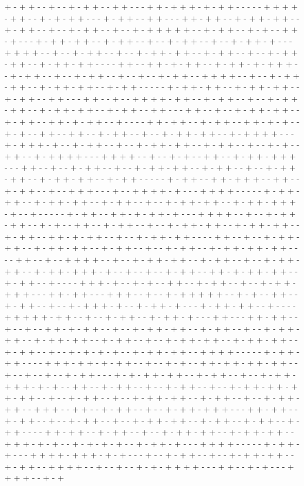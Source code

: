 + - + + - - + - - + - + + - - + + - - - + + - + + + - + - + + - - - - - + + + + - + + - - + - + - + + - - - + - + + - - + + - - - + + - + + - - + - + + - + + - - + - + + - - + - - + - + + - - + - - + - + + + + + - - + - + + - - + - + - - + + - + - - - + - + + - + + - - + - + + - - + - - + - + + - - + - - + - + + - + - - - + + + + - - + - - + - + + - - + - - + - + + - + + - - + - + + - - + - - + - + + - + + - - + - + + - + + - - - - + + - - + + - + - + + - - + - + + - + - + + + - - + - + + - - + - - + - + + - - + - - + - - + - + + - - + + + + - - + - - + - + + - + + - - + - + + - + + - - + - + + - - - - - + - + + - + + - - + - + + - + + - - + - + + - - + + - - - + + - - + - - + + + + - + + - - + - + + - - + - - + - + + - + + - - + - + + - + + - - + - + + - - + + - - - + + - - + - - + - + + - + + - - + - + + - - + + - + - + + - - + - - - - + + - + + - - + - + + - - + + - + - + - - + - + - - + + - - + + - - + - + + - - + - - + - + + - + + - - + - + + + + - - - + - + + + - + - - + - + + - - + - - + - + + - + + - - + - + + - - + - - + - + - - + + - - + - + + + + - - - + + + + - - + - - + - + - - + + - - + - + + - + + + - - - + + - - + - - + - + + - - + - - + - + + - + + - - + - + + - - + - - + - + + - + + - - + - + + - + + - - + - + + - - - - - + - + + - - + + - + + + - - + + - - + - + + - - + - - + + + - - - + - - + + + + - + - - - + + + + - - - - - + - + + - + + - - + - + + - + + - - + - + + - - + - - + - + + - + + - - + - + + - + + + - + - - + - - - - - + - + + - - + + - + - + + - + - - - + + + + - - + - - + - + + - + + - - + - + - - + + - - + - + + - - + - - + - + + - + + - - + - + + - + + - - + - + + - - + + - + - + + - - + - - + - + + - + + - - - - + + - - + - - + - + + - + + - - + - + + - + + - - + - + + - - + - - + - + + - - + - + + - + + - + + - - - - + + - - + - - + + + + - - + - - + - + + - + + - - + - + + - - + - - + - + + - + + - - + - + + - + + + - + - - + - - + - - + - + + - - + + - + - + + - + + - - + - + + - - + - - - - + + + - + - - + - + - - + + - - + - + + - - + - - + - + + - + + + - - - + + - + + - - - + + + - - + - - + - + + + + + - - + - + - - + + - - + - + + - - + - - + - + + + - + - - + - + + - + - - - + - + + - + + - - + - - - - + + + + + - + + - - + - - + - + + - - + - + + - + - - - + + - - - + + - + + - - + - - + - - + + - + - + + - - + - - + - + + - + + - - + - + + - - + - - + - + + - + + - - + - + + - + + - - + - + + - - + - - + - + + - + + - - + - + + - + + - - + - + + - - + - - + - + - + - + - - + - + + - + + - - + + + + - - - - - + - + + - + + - - - - + + + - + + - + - + + - - + - - + - + - - + + - + + - + + - + + - - + - - + - - + - - + - + + - - - + - + - + + - + + - - + - + + - - + - - + - + + - + + + - + - + - - + + - - + - + + - - + - - + - + + - - + - - + - + + - + + - + + - + + - - + - - + - + + - - + - - + - + + - + + - - + - + + - - + - - + - + + - + + - - + + + - - + + - - + - + + - - + - - + - + + - + + + - - - + + - + + - - + - + + - - + - - + - + + - - + - - + - + + - + + - - + - + + - - + - + + - - + - + + - - - - + + - + + - - + - + + - - + - - + - + + - + + - - + - + + - + + - - + + + - + - + - - + - + - + - + - - + - + + - + - - - + + + + - - - - - + - + + - + - - - + + + + - + + + - + - + - - - + - - + - + + - - + - - + - + + - + + - - + - + + - - + + + + - - + - - + - - + - + - + + + + - - - + + - - + - + - - - + + + + - - + - + 